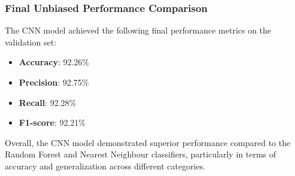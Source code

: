 \subsubsection{Final Unbiased Performance Comparison}
The CNN model achieved the following final performance metrics on the validation set:
\begin{itemize}
    \item \textbf{Accuracy}: 92.26\%
    \item \textbf{Precision}: 92.75\%
    \item \textbf{Recall}: 92.28\%
    \item \textbf{F1-score}: 92.21\%
\end{itemize}

Overall, the CNN model demonstrated superior performance compared to the Random Forest and Nearest Neighbour classifiers, particularly in terms of accuracy and generalization across different categories.

